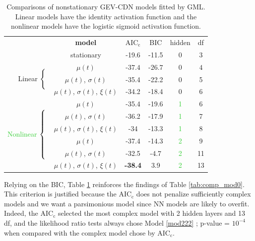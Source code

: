 \begin{table}[!htbp] 
	\centering \caption{Comparisons of nonstationary GEV-CDN models fitted by GML. Linear models have the identity activation function and the nonlinear models have the logistic sigmoid activation function. } 
	\label{tab:comp_mod} 
	\hspace{-2.5cm}
\begin{tabular}{@{\extracolsep{5pt}} rccccc} 
	\cmidrule[\heavyrulewidth]{2-6}
 &	\textbf{model} & $\text{AIC}_{\text{c}}$ & BIC & hidden & df \\
	\cmidrule{2-6}
	
	& stationary & -19.6 & -11.5 & 0 & 3 \\ 
	\multirow{3}{*}{Linear $\begin{dcases*} \\ \\  \end{dcases*}$} 
	&$\mu(t)$ & -$37.4$ & -$\boldsymbol{26.7}$ & $0$ & $4$  \\ \hspace{-0.5cm}
	&$\mu(t)$, $\sigma(t)$ & -35.4 & -22.2 & 0 & 5 \\
	&$\mu(t)$, $\sigma(t)$, $\xi(t)$ & -34.2 & -18.4 & 0 & 6 \\
	
	 \multirow{6}{*}{\textcolor{LimeGreen}{Nonlinear} $\begin{dcases*} \\ \\ \\ \\ \\ \end{dcases*}$} &	$\mu(t)$ & -35.4 & -19.6 & \textcolor{LimeGreen}{1} & 6 \\
	&$\mu(t)$, $\sigma(t)$ &  -36.2  & -17.9 & \textcolor{LimeGreen}{1} & 7 \\ 
	&$\mu(t)$, $\sigma(t)$, $\xi(t)$ & -34 & -13.3 & \textcolor{LimeGreen}{1} & 8 \\
	&$\mu(t)$ & -37.4 & -14.3 & \textcolor{LimeGreen}{2} & 9 \\
	&$\mu(t)$, $\sigma(t)$ & -32.5 & -4.7 & \textcolor{LimeGreen}{2} & 11 \\
	&$\mu(t)$, $\sigma(t)$, $\xi(t)$ & \textbf{-38.4} & 3.9 & \textcolor{LimeGreen}{2} & 13 \\		\cmidrule[\heavyrulewidth]{2-6}
\end{tabular}
\end{table}

Relying on the BIC, Table \ref{tab:comp_mod} reinforces the findings of Table \ref{tab:comp_mod0}. This criterion is justified because the $\text{AIC}_{\text{c}}$ does not penalize sufficiently complex models and we want a parsimonious model since NN models are likely to overfit. Indeed, the $\text{AIC}_{\text{c}}$ selected the most complex model with 2 hidden layers and 13 df, and the likelihood ratio tests always chose Model \ref{mod222} ; p-value = $10^{-4}$ when compared with the complex model chose by $\text{AIC}_{\text{c}}$.
 	
